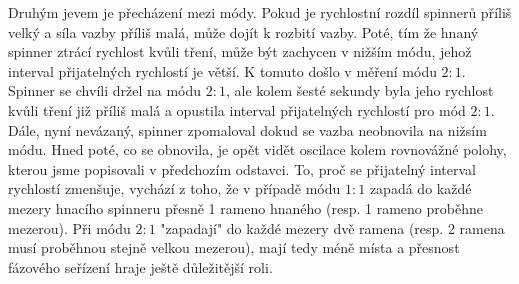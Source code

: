 Druhým jevem je přecházení mezi módy. Pokud je rychlostní rozdíl spinnerů příliš velký a síla vazby příliš malá, může dojít k rozbití vazby. Poté, tím že hnaný spinner ztrácí rychlost kvůli tření, může být zachycen v nižším módu, jehož interval přijatelných rychlostí je větší. K tomuto došlo v měření módu $2:1$. Spinner se chvíli držel na módu $2:1$, ale kolem šesté sekundy byla jeho rychlost kvůli tření již příliš malá a opustila interval přijatelných rychlostí pro mód $2:1$. Dále, nyní nevázaný, spinner zpomaloval dokud se vazba neobnovila na nižsím módu. Hned poté, co se obnovila, je opět vidět oscilace kolem rovnovážné polohy, kterou jsme popisovali v předchozím odstavci. To, proč se přijatelný interval rychlostí zmenšuje, vychází z toho, že v případě módu $1:1$ zapadá do každé mezery hnacího spinneru přesně 1 rameno hnaného (resp. 1 rameno proběhne mezerou). Při módu $2:1$ "zapadají" do každé mezery dvě ramena (resp. 2 ramena musí proběhnou stejně velkou mezerou), mají tedy méně místa a přesnost fázového seřízení hraje ještě důležitější roli.

\clearpage




